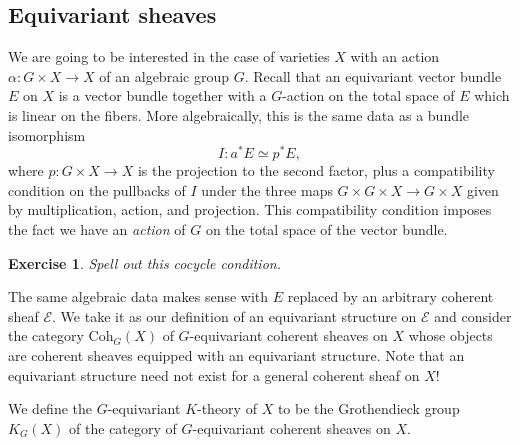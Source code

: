 \documentclass[11pt]{amsart}
\newtheorem{exercise}[dummy]{Exercise}
\theoremstyle{definition}
\newcommand{\Ec}{\mathcal{E}}
\newcommand{\Coh}{\mathrm{Coh}}
\numberwithin{equation}{subsection}
\numberwithin{figure}{subsection}
\begin{document}
\subsection{Equivariant sheaves}
We are going to be interested in the case of varieties $X$ with an action $\alpha:G\times X\rightarrow X$ of an algebraic group $G$. Recall that an equivariant vector bundle $E$ on $X$ is a vector bundle together with a $G$-action on the total space of $E$ which is linear on the fibers. More algebraically, this is the same data as a bundle isomorphism
$$
I\colon a^*E\simeq p^*E,
$$
where $p:G\times X\rightarrow X$ is the projection to the second factor,
plus a compatibility condition on the pullbacks of $I$ under the three maps $G\times G\times X\rightarrow G\times X$  given by multiplication, action, and projection. This compatibility condition imposes the fact we have an \emph{action} of $G$ on the total space of the vector bundle.
\begin{exercise}
Spell out this cocycle condition.
\end{exercise}
 The same algebraic data makes sense with $E$ replaced by an arbitrary coherent sheaf $\Ec$. We take it as our definition of an equivariant structure on $\Ec$ and consider the category $\Coh_G(X)$ of $G$-equivariant coherent sheaves on $X$ whose objects are coherent sheaves equipped with an equivariant structure. Note that an equivariant structure need not exist for a general coherent sheaf on $X$! 

We define the $G$-equivariant $K$-theory of $X$ to be the Grothendieck group $K_G(X)$ of the category of $G$-equivariant coherent sheaves on $X$.
\end{document}
